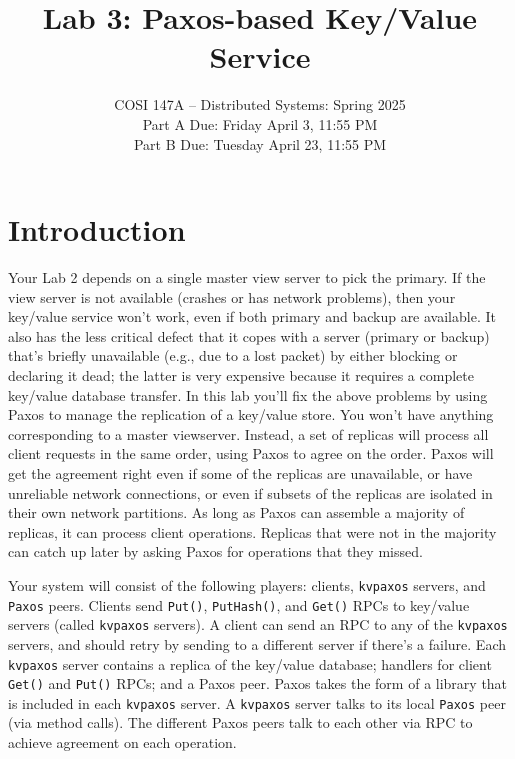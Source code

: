 \documentclass{article}
\title{Lab 3: Paxos-based Key/Value Service}
\author{COSI 147A -- Distributed Systems: Spring 2025 \\
    Part A Due: Friday April 3, 11:55 PM \\
    Part B Due: Tuesday April 23, 11:55 PM \\
    }
\date{}
\newcommand{\code}{\texttt}
\begin{document}
\maketitle

\section{Introduction}
Your Lab 2 depends on a single master view server to pick the primary.
If the view server is not available (crashes or has network problems),
then your key/value service won't work, even if both primary and backup
are available. It also has the less critical defect that it copes with a
server (primary or backup) that's briefly unavailable (e.g., due to a lost
packet) by either blocking or declaring it dead; the latter is very
expensive because it requires a complete key/value database transfer.
In this lab you'll fix the above problems by using Paxos to manage the
replication of a key/value store. You won't have anything corresponding
to a master viewserver. Instead, a set of replicas will process all client
requests in the same order, using Paxos to agree on the order. Paxos
will get the agreement right even if some of the replicas are unavailable,
or have unreliable network connections, or even if subsets of the
replicas are isolated in their own network partitions. As long as Paxos
can assemble a majority of replicas, it can process client operations.
Replicas that were not in the majority can catch up later by asking
Paxos for operations that they missed.

Your system will consist of the following players: clients, \code{kvpaxos}
servers, and \code{Paxos} peers. Clients send \code{Put()}, \code{PutHash()}, and \code{Get()}
RPCs to key/value servers (called \code{kvpaxos} servers). A client can send
an RPC to any of the \code{kvpaxos} servers, and should retry by sending to a
different server if there's a failure. Each \code{kvpaxos} server contains a
replica of the key/value database; handlers for client \code{Get()} and \code{Put()}
RPCs; and a Paxos peer. Paxos takes the form of a library that is
included in each \code{kvpaxos} server. A \code{kvpaxos} server talks to its local \code{Paxos} peer (via method calls). The different Paxos peers talk to each
other via RPC to achieve agreement on each operation.
\end{document}
